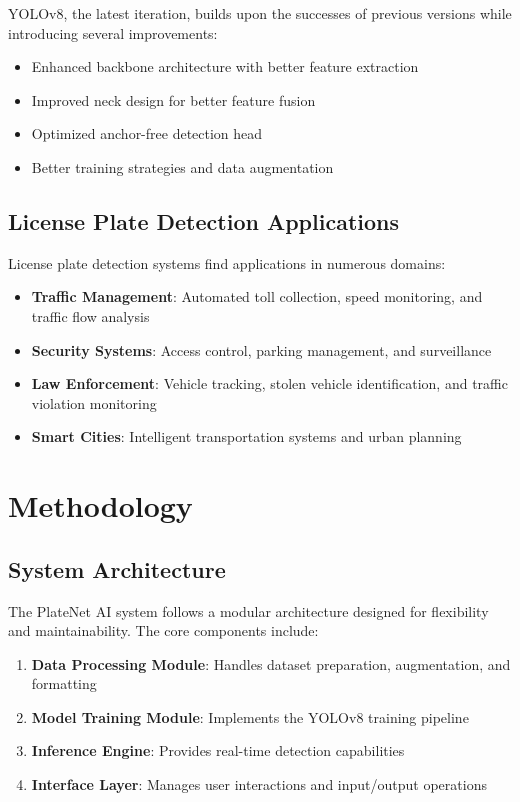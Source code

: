 \documentclass[12pt,a4paper]{article}
\begin{document}
YOLOv8, the latest iteration, builds upon the successes of previous versions while introducing several improvements:

\begin{itemize}
    \item Enhanced backbone architecture with better feature extraction
    \item Improved neck design for better feature fusion
    \item Optimized anchor-free detection head
    \item Better training strategies and data augmentation
\end{itemize}

\subsection{License Plate Detection Applications}

License plate detection systems find applications in numerous domains:

\begin{itemize}
    \item \textbf{Traffic Management}: Automated toll collection, speed monitoring, and traffic flow analysis
    \item \textbf{Security Systems}: Access control, parking management, and surveillance
    \item \textbf{Law Enforcement}: Vehicle tracking, stolen vehicle identification, and traffic violation monitoring
    \item \textbf{Smart Cities}: Intelligent transportation systems and urban planning
\end{itemize}

\section{Methodology}

\subsection{System Architecture}

The PlateNet AI system follows a modular architecture designed for flexibility and maintainability. The core components include:

\begin{enumerate}
    \item \textbf{Data Processing Module}: Handles dataset preparation, augmentation, and formatting
    \item \textbf{Model Training Module}: Implements the YOLOv8 training pipeline
    \item \textbf{Inference Engine}: Provides real-time detection capabilities
    \item \textbf{Interface Layer}: Manages user interactions and input/output operations
\end{enumerate}
\end{document}

